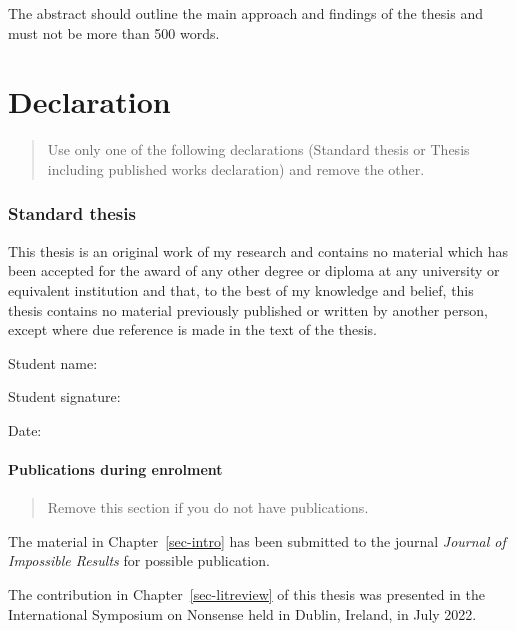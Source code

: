 \documentclass[
  11pt,
  a4paper,
  nottoc]{report}
\begin{document}

The abstract should outline the main approach and findings of the thesis
and must not be more than 500 words.


\chapter*{Declaration}\label{declaration}


\begin{quote}
Use only one of the following declarations (Standard thesis or Thesis
including published works declaration) and remove the other.
\end{quote}

\subsection*{Standard thesis}\label{standard-thesis}

This thesis is an original work of my research and contains no material
which has been accepted for the award of any other degree or diploma at
any university or equivalent institution and that, to the best of my
knowledge and belief, this thesis contains no material previously
published or written by another person, except where due reference is
made in the text of the thesis.

Student name:

Student signature:

Date:

\subsubsection*{Publications during
enrolment}\label{publications-during-enrolment}

\begin{quote}
Remove this section if you do not have publications.
\end{quote}

The material in Chapter~\ref{sec-intro} has been submitted to the
journal \emph{Journal of Impossible Results} for possible publication.

The contribution in Chapter~\ref{sec-litreview} of this thesis was
presented in the International Symposium on Nonsense held in Dublin,
Ireland, in July 2022.
\end{document}
